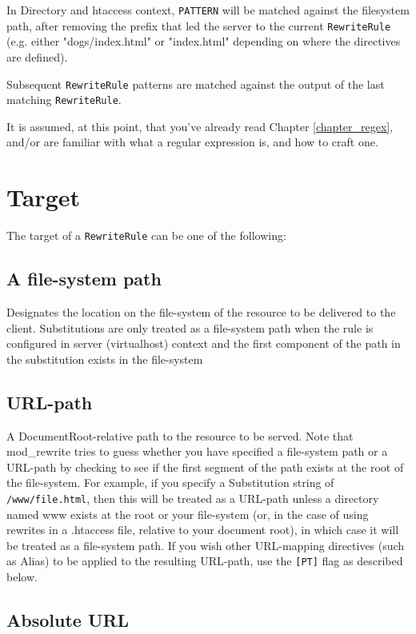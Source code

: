 In Directory and htaccess context, \verb~PATTERN~ will be matched against the filesystem path, after removing the prefix that led the server to the current \verb~RewriteRule~ (e.g. either "dogs/index.html" or "index.html" depending on where the directives are defined).

Subsequent \verb~RewriteRule~ patterns are matched against the output of the last matching \verb~RewriteRule~.

It is assumed, at this point, that you've already read Chapter \ref{chapter_regex}, and/or are familiar with what a regular expression is, and how to craft one.

\section{Target}

The target of a \verb~RewriteRule~ can be one of the following:

\subsection{A file-system path}

Designates the location on the file-system of the resource to be delivered to the client. Substitutions are only treated as a file-system path when the rule is configured in server (virtualhost) context and the first component of the path in the substitution exists in the file-system

\subsection{URL-path}

A DocumentRoot-relative path to the resource to be served. Note that mod\_rewrite tries to guess whether you have specified a file-system path or a URL-path by checking to see if the first segment of the path exists at the root of the file-system. For example, if you specify a Substitution string of \verb~/www/file.html~, then this will be treated as a URL-path unless a directory named www exists at the root or your file-system (or, in the case of using rewrites in a .htaccess file, relative to your document root), in which case it will be treated as a file-system path. If you wish other URL-mapping directives (such as Alias) to be applied to the resulting URL-path, use the \verb~[PT]~ flag as described below.

\subsection{Absolute URL}

